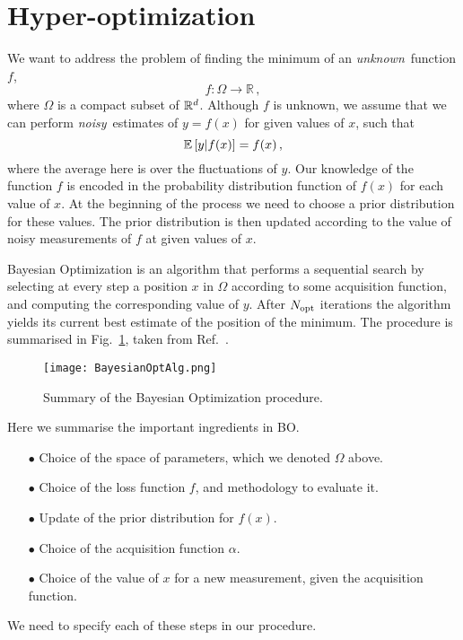 \section{Hyper-optimization}
\label{sec:hyper-opt}

We want to address the problem of finding the minimum of an {\em unknown}\ function $f$,
\begin{equation}
    \label{eq:FDef}
    f: \Omega \to \mathbb{R}\, ,
\end{equation} 
where $\Omega$ is a compact subset of $\mathbb{R}^d$. Although $f$ is unknown, we assume
that we can perform {\em noisy}\ estimates of $y=f(x)$ for given values of $x$,
such that
\begin{equation}
    \label{eq:UnbiasedEval}
    \mathbb{E}\left[y|f(x)\right] = f(x)\, ,
\end{equation}
where the average here is over the fluctuations of $y$. Our knowledge of the function $f$ is encoded in the probability distribution function of $f(x)$ for each value of $x$. At the beginning of the process we need to choose a prior distribution for these values. The prior distribution is then updated according to the value of noisy measurements of $f$ at given values of $x$.  

Bayesian Optimization is an algorithm that performs a sequential search by
selecting at every step a position $x$ in $\Omega$ according to some acquisition
function, and computing the corresponding value of $y$. After $N_\mathrm{opt}$ iterations
the algorithm yields its current best estimate of the position of the minimum.
The procedure is summarised in Fig.~\ref{fig:BOpt}, taken from
Ref.~\cite{Shahriari}.

\begin{figure}[ht!]
    \label{fig:BOpt}
    \centering
    \texttt{[image: BayesianOptAlg.png]}
    \caption{\small Summary of the Bayesian Optimization procedure.}
\end{figure}

Here we summarise the important ingredients in BO. 
%
\begin{enumerate}
    \item[$\bullet$] Choice of the space of parameters, which we denoted $\Omega$ above.  
    \item[$\bullet$] Choice of the loss function $f$, and methodology to evaluate it. 
    \item[$\bullet$] Update of the prior distribution for $f(x)$.
    \item[$\bullet$] Choice of the acquisition function $\alpha$.
    \item[$\bullet$] Choice of the value of $x$ for a new measurement, given the acquisition function.   
\end{enumerate}
%
We need to specify each of these steps in our procedure. 



